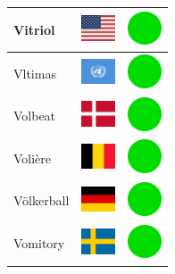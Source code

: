 \documentclass[12pt, a4paper, twoside]{report}
\begin{document}
\begin{center}
\begin{longtable}{|p{5cm}|p{2cm}|p{2cm}|}
 Vitriol                                                    & \includegraphics[width=1cm]{../img/flags/us} &   \includegraphics[width=1cm]{../likes/y} \\ \hline
 Vltimas                                                    & \includegraphics[width=1cm]{../img/flags/un} &   \includegraphics[width=1cm]{../likes/y} \\ \hline
 Volbeat                                                    & \includegraphics[width=1cm]{../img/flags/dk} &   \includegraphics[width=1cm]{../likes/y} \\ \hline
 Volière                                                    & \includegraphics[width=1cm]{../img/flags/be} &   \includegraphics[width=1cm]{../likes/y} \\ \hline
 Völkerball                                                 & \includegraphics[width=1cm]{../img/flags/de} &   \includegraphics[width=1cm]{../likes/y} \\ \hline
 Vomitory                                                   & \includegraphics[width=1cm]{../img/flags/se} &   \includegraphics[width=1cm]{../likes/y} \\ \hline

\end{longtable}
\end{center}
\end{document}
